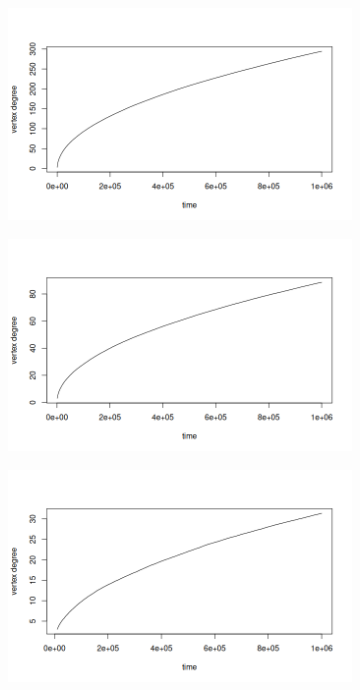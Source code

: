 \begin{figure}[ht]
\begin{subfigure}{.5\textwidth}
  \includegraphics[width=\linewidth]{figures/scaling_BA/sc_ba_2.png}
\end{subfigure}%
\begin{subfigure}{.5\textwidth}
  \centering
  \includegraphics[width=\linewidth]{figures/scaling_BA/sc_ba_3.png}
\end{subfigure}
\begin{subfigure}{.5\textwidth}
  \centering
  \includegraphics[width=\linewidth]{figures/scaling_BA/sc_ba_4.png}

\end{subfigure}
\end{figure}
